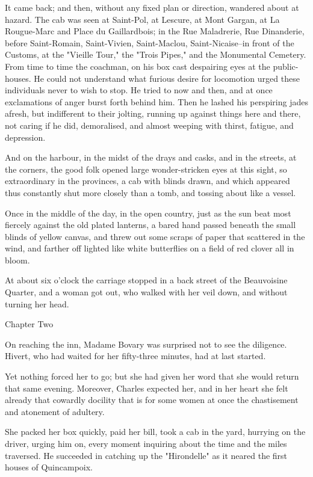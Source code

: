 \documentclass{tufte-book}
\begin{document}
It came back; and then, without any fixed plan or direction, wandered
about at hazard. The cab was seen at Saint-Pol, at Lescure, at Mont
Gargan, at La Rougue-Marc and Place du Gaillardbois; in the Rue
Maladrerie, Rue Dinanderie, before Saint-Romain, Saint-Vivien,
Saint-Maclou, Saint-Nicaise--in front of the Customs, at the "Vieille
Tour," the "Trois Pipes," and the Monumental Cemetery. From time to time
the coachman, on his box cast despairing eyes at the public-houses.
He could not understand what furious desire for locomotion urged these
individuals never to wish to stop. He tried to now and then, and at
once exclamations of anger burst forth behind him. Then he lashed his
perspiring jades afresh, but indifferent to their jolting, running up
against things here and there, not caring if he did, demoralised, and
almost weeping with thirst, fatigue, and depression.

And on the harbour, in the midst of the drays and casks, and in the
streets, at the corners, the good folk opened large wonder-stricken
eyes at this sight, so extraordinary in the provinces, a cab with blinds
drawn, and which appeared thus constantly shut more closely than a tomb,
and tossing about like a vessel.

Once in the middle of the day, in the open country, just as the sun
beat most fiercely against the old plated lanterns, a bared hand passed
beneath the small blinds of yellow canvas, and threw out some scraps
of paper that scattered in the wind, and farther off lighted like white
butterflies on a field of red clover all in bloom.

At about six o'clock the carriage stopped in a back street of the
Beauvoisine Quarter, and a woman got out, who walked with her veil down,
and without turning her head.



Chapter Two

On reaching the inn, Madame Bovary was surprised not to see the
diligence. Hivert, who had waited for her fifty-three minutes, had at
last started.

Yet nothing forced her to go; but she had given her word that she would
return that same evening. Moreover, Charles expected her, and in her
heart she felt already that cowardly docility that is for some women at
once the chastisement and atonement of adultery.

She packed her box quickly, paid her bill, took a cab in the yard,
hurrying on the driver, urging him on, every moment inquiring about
the time and the miles traversed. He succeeded in catching up the
"Hirondelle" as it neared the first houses of Quincampoix.
\end{document}
